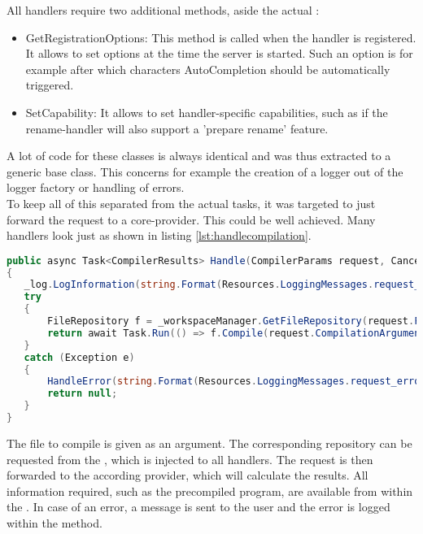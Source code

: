 All handlers require two additional methods, aside the actual :
\begin{itemize}
    \item GetRegistrationOptions: This method is called when the handler is registered.
    It allows to set options at the time the server is started.
    Such an option is for example after which characters AutoCompletion should be automatically triggered.
    \item SetCapability: It allows to set handler-specific capabilities, such as if the rename-handler will also support a 'prepare rename' feature.
\end{itemize}

A lot of code for these classes is always identical and was thus extracted to a generic base class.
This concerns for example the creation of a logger out of the logger factory or handling of errors.\\

To keep all of this separated from the actual tasks, it was targeted to just forward the request to a core-provider.
This could be well achieved.
Many handlers look just as shown in listing \ref{lst:handlecompilation}.

\begin{lstlisting}[language=csharp, caption={Handling Compilation}, captionpos=b, label={lst:handlecompilation}]
public async Task<CompilerResults> Handle(CompilerParams request, CancellationToken cancellationToken)
{
   _log.LogInformation(string.Format(Resources.LoggingMessages.request_handle, _method));
   try
   {
       FileRepository f = _workspaceManager.GetFileRepository(request.FileToCompile);
       return await Task.Run(() => f.Compile(request.CompilationArguments), cancellationToken);
   }
   catch (Exception e)
   {
       HandleError(string.Format(Resources.LoggingMessages.request_error, _method), e);
       return null;
   }
}
\end{lstlisting}

The file to compile is given as an argument.
The corresponding repository can be requested from the , which is injected to all handlers.
The request is then forwarded to the according provider, which will calculate the results.
All information required, such as the precompiled program, are available from within the .
In case of an error, a message is sent to the user and the error is logged within the  method.\\


